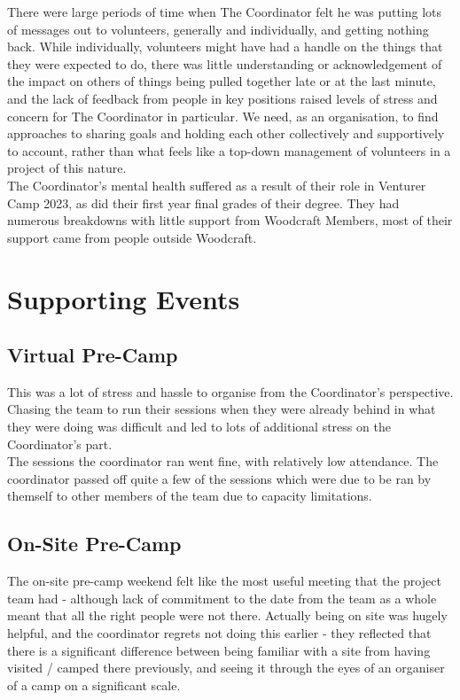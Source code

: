 There were large periods of time when The Coordinator felt he was putting lots of messages out to volunteers, generally and individually, and getting nothing back. While individually, volunteers might have had a handle on the things that they were expected to do, there was little understanding or acknowledgement of the impact on others of things being pulled together late or at the last minute, and the lack of feedback from people in key positions raised levels of stress and concern for The Coordinator in particular. We need, as an organisation, to find approaches to sharing goals and holding each other collectively and supportively to account, rather than what feels like a top-down management of volunteers in a project of this nature.\\

The Coordinator's mental health suffered as a result of their role in Venturer Camp 2023, as did their first year final grades of their degree. They had numerous breakdowns with little support from Woodcraft Members, most of their support came from people outside Woodcraft.

\section{Supporting Events}
\subsection{Virtual Pre-Camp}
This was a lot of stress and hassle to organise from the Coordinator's perspective. Chasing the team to run their sessions when they were already behind in what they were doing was difficult and led to lots of additional stress on the Coordinator's part.\\

The sessions the coordinator ran went fine, with relatively low attendance. The coordinator passed off quite a few of the sessions which were due to be ran by themself to other members of the team due to capacity limitations.

\subsection{On-Site Pre-Camp}
The on-site pre-camp weekend felt like the most useful meeting that the project team had - although lack of commitment to the date from the team as a whole meant that all the right people were not there. Actually being on site was hugely helpful, and the coordinator regrets not doing this earlier - they reflected that there is a significant difference between being familiar with a site from having visited / camped there previously, and seeing it through the eyes of an organiser of a camp on a significant scale.\\

